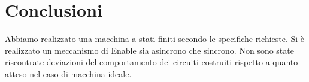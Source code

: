 \documentclass[10pt,a4paper]{article}
\begin{document}
\section{Conclusioni}
Abbiamo realizzato una macchina a stati finiti secondo le specifiche richieste.
Si è realizzato un meccanismo di Enable sia asincrono che sincrono.
Non sono state riscontrate deviazioni del comportamento dei circuiti costruiti rispetto a quanto atteso nel caso di macchina ideale.
\end{document}
